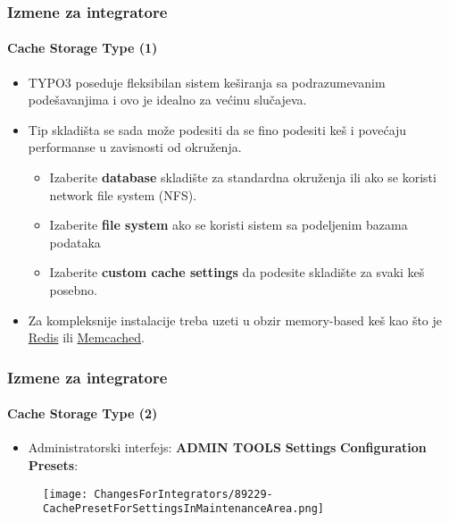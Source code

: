 \begin{frame}[fragile]
	\frametitle{Izmene za integratore}
	\framesubtitle{Cache Storage Type (1)}

	\begin{itemize}

		\item TYPO3 poseduje fleksibilan sistem keširanja sa podrazumevanim podešavanjima
			i ovo je idealno za većinu slučajeva.
		\item Tip skladišta se sada može podesiti da se fino podesiti keš i povećaju
			performanse u zavisnosti od okruženja.

			\begin{itemize}
				\item Izaberite \textbf{database} skladište za standardna okruženja ili ako se
				 	koristi network file system (NFS).
				\item Izaberite \textbf{file system} ako se koristi sistem sa podeljenim
					bazama podataka
				\item Izaberite \textbf{custom cache settings} da podesite skladište za svaki
					keš posebno.
			\end{itemize}

		\item Za kompleksnije instalacije treba uzeti u obzir memory-based keš kao što je
			\href{https://redis.io/}{Redis}
			ili
			\href{https://memcached.org/}{Memcached}.

	\end{itemize}

\end{frame}


%

\begin{frame}[fragile]
	\frametitle{Izmene za integratore}
	\framesubtitle{Cache Storage Type (2)}

	\begin{itemize}

		\item Administratorski interfejs: \textbf{ADMIN TOOLS} \hspace{0.1cm}\textbf{Settings} \hspace{0.1cm}\textbf{Configuration Presets}:
		\end{itemize}

	\begin{figure}
		\texttt{[image: ChangesForIntegrators/89229-CachePresetForSettingsInMaintenanceArea.png]}
	\end{figure}

\end{frame}

